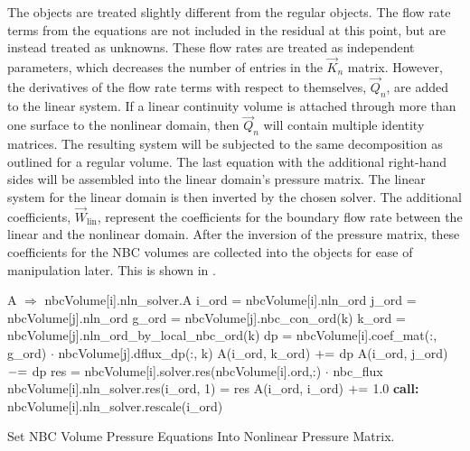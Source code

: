 The  objects are treated slightly different from the regular  objects.
The flow rate terms from the equations are not included in the residual at this point, but are instead treated as unknowns.
These flow rates are treated as independent parameters, which decreases the number of entries in the $\vec{K}_{n}$ matrix.
However, the derivatives of the flow rate terms with respect to themselves, $\vec{Q}_{n}$, are added to the linear system.
If a linear continuity volume is attached through more than one surface to the nonlinear domain, then $\vec{Q}_{n}$ will contain multiple identity matrices.
The resulting system will be subjected to the same  decomposition as outlined for a regular volume.
The last equation with the additional right-hand sides will be assembled into the linear domain's pressure matrix.
The linear system for the linear domain is then inverted by the chosen solver.
The additional coefficients, $\vec{W}_{\text{lin}}$, represent the coefficients for the boundary flow rate between the linear and the nonlinear domain.
After the inversion of the pressure matrix, these coefficients for the NBC volumes are collected into the  objects for ease of manipulation later.
This is shown in .

\begin{algo}[ht!]
\setlength{\baselineskip}{0.625\baselineskip}
\begin{algorithmic}[1]
	\Set A $\Rightarrow$ nbcVolume[i].nln\_solver.A
	\Set i\_ord = nbcVolume[i].nln\_ord
		\Set j\_ord = nbcVolume[j].nln\_ord
			\Set g\_ord = nbcVolume[j].nbc\_con\_ord(k)
			\Set k\_ord = nbcVolume[j].nln\_ord\_by\_local\_nbc\_ord(k)
			\Set dp = nbcVolume[i].coef\_mat(:, g\_ord) $\cdot$ nbcVolume[j].dflux\_dp(:, k)
			\Set A(i\_ord, k\_ord) $\mathrel{+}=$ dp
			\Set A(i\_ord, j\_ord) $\mathrel{-}=$ dp
		\EndFor
	\EndFor
	\Set res = nbcVolume[i].solver.res(nbcVolume[i].ord,:) $\cdot$ nbc\_flux
	\Set nbcVolume[i].nln\_solver.res(i\_ord, 1) = res
	\Set A(i\_ord, i\_ord) $\mathrel{+}=$ 1.0
	\State \textbf{call:} nbcVolume[i].nln\_solver.rescale(i\_ord)
\EndFor
\end{algorithmic}
\caption{Set NBC Volume Pressure Equations Into Nonlinear Pressure Matrix.}
\label{alg:domDecompSetMat}
\end{algo}

